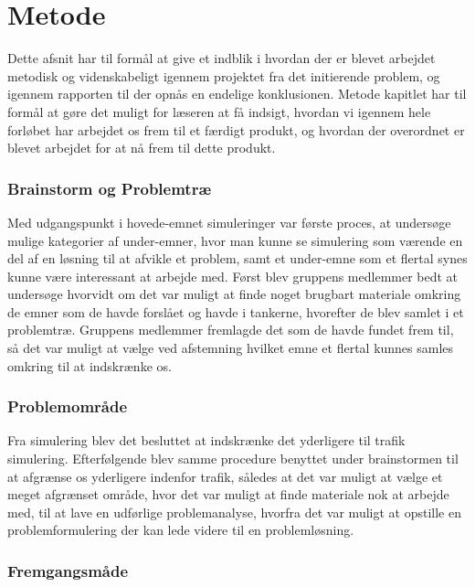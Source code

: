 \chapter{Metode}\label{Metode}

Dette afsnit har til formål at give et indblik i hvordan der er blevet arbejdet metodisk og videnskabeligt igennem projektet fra det initierende problem, og igennem rapporten til der opnås en endelige konklusionen. Metode kapitlet har til formål at gøre det muligt for læseren at få indsigt, hvordan vi igennem hele forløbet har arbejdet os frem til et færdigt produkt, og hvordan der overordnet er blevet arbejdet for at nå frem til dette produkt.

\subsection{Brainstorm og Problemtræ}

Med udgangspunkt i hovede-emnet simuleringer var første proces, at undersøge mulige kategorier af under-emner, hvor man kunne se simulering som værende en del af en løsning til at afvikle et problem, samt et under-emne som et flertal synes kunne være interessant at arbejde med. Først blev gruppens medlemmer bedt at undersøge hvorvidt om det var muligt at finde noget brugbart materiale omkring de emner som de havde forslået og havde i tankerne, hvorefter de blev samlet i et problemtræ. Gruppens medlemmer fremlagde det som de havde fundet frem til, så det var muligt at vælge ved afstemning hvilket emne et flertal kunnes samles omkring til at indskrænke os.

\subsection{Problemområde}

Fra simulering blev det besluttet at indskrænke det yderligere til trafik simulering. Efterfølgende blev samme procedure benyttet under brainstormen til at afgrænse os yderligere indenfor trafik, således at det var muligt at vælge et meget afgrænset område, hvor det var muligt at finde materiale nok at arbejde med, til at lave en udførlige problemanalyse, hvorfra det var muligt at opstille en problemformulering der kan lede videre til en problemløsning. 

\subsection{Fremgangsmåde}

